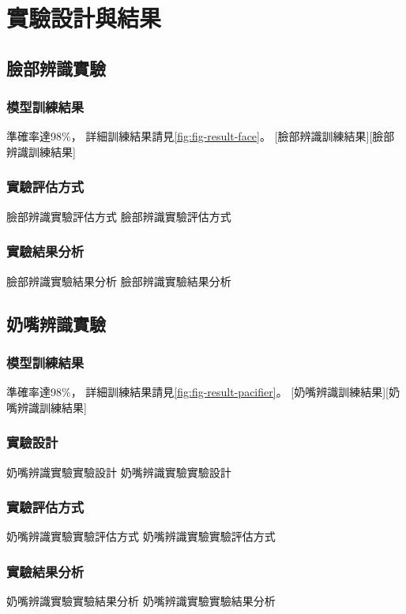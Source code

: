 \documentclass[class=NCU_thesis, crop=false]{standalone}
\begin{document}
\chapter{實驗設計與結果}

\section{臉部辨識實驗}
\subsection{模型訓練結果}
準確率達98\%，
詳細訓練結果請見\cref{fig:fig-result-face}。
[臉部辨識訓練結果][臉部辨識訓練結果]

\subsection{實驗評估方式}
臉部辨識實驗評估方式 臉部辨識實驗評估方式

\subsection{實驗結果分析}
臉部辨識實驗結果分析 臉部辨識實驗結果分析

\section{奶嘴辨識實驗}
\subsection{模型訓練結果}
準確率達98\%，
詳細訓練結果請見\cref{fig:fig-result-pacifier}。
[奶嘴辨識訓練結果][奶嘴辨識訓練結果]

\subsection{實驗設計}
奶嘴辨識實驗實驗設計 奶嘴辨識實驗實驗設計

\subsection{實驗評估方式}
奶嘴辨識實驗實驗評估方式 奶嘴辨識實驗實驗評估方式

\subsection{實驗結果分析}
奶嘴辨識實驗實驗結果分析 奶嘴辨識實驗實驗結果分析
\end{document}
